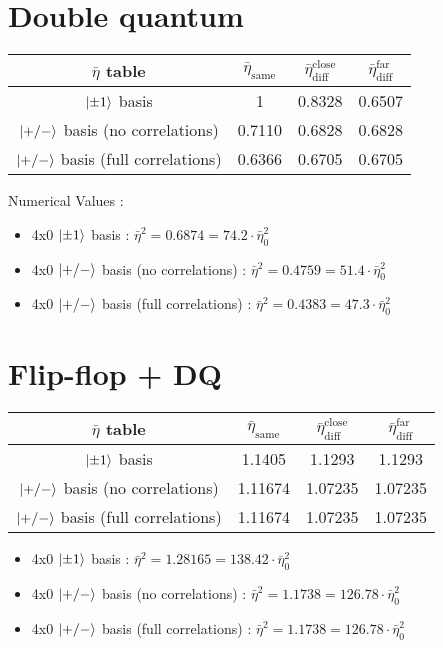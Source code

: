 \documentclass[a4paper]{article}
\begin{document}
\section{Double quantum}
\begin{tabular}{cccc}
\hline
$\bar{\eta}$ table & $\bar{\eta}_\textrm{same}$ & $\bar{\eta}_\textrm{diff}^\textrm{close}$ & $\bar{\eta}_\textrm{diff}^\textrm{far}$ \\
\hline
$\ket{\pm 1}$ basis & 1 & 0.8328 & 0.6507 \\
$\ket{+/-}$ basis (no correlations) & 0.7110  & 0.6828 & 0.6828 \\
$\ket{+/-}$ basis (full correlations) & 0.6366 & 0.6705 & 0.6705  \\
\hline
\end{tabular}

\bigskip
Numerical Values :
\begin{itemize}
\medskip

\item 4x0 $\ket{\pm 1}$ basis : $\bar{\eta}^2 = 0.6874 = 74.2 \cdot \bar{\eta}^2_0$
\item 4x0 $\ket{+/-}$ basis (no correlations) : $\bar{\eta}^2 = 0.4759 = 51.4 \cdot \bar{\eta}^2_0$
\item 4x0 $\ket{+/-}$ basis (full correlations) : $\bar{\eta}^2 = 0.4383 = 47.3 \cdot \bar{\eta}^2_0$

\end{itemize}

\section{Flip-flop + DQ}
\begin{tabular}{cccc}

\hline
$\bar{\eta}$ table & $\bar{\eta}_\textrm{same}$ & $\bar{\eta}_\textrm{diff}^\textrm{close}$ & $\bar{\eta}_\textrm{diff}^\textrm{far}$ \\
\hline
$\ket{\pm 1}$ basis & 1.1405  & 1.1293 & 1.1293 \\
$\ket{+/-}$ basis (no correlations) & 1.11674  & 1.07235 & 1.07235 \\
$\ket{+/-}$ basis (full correlations) & 1.11674  & 1.07235 & 1.07235 \\
\hline
\end{tabular}
\begin{itemize}
\item 4x0 $\ket{\pm 1}$ basis : $\bar{\eta}^2 = 1.28165 = 138.42 \cdot \bar{\eta}^2_0$
\item 4x0 $\ket{+/-}$ basis (no correlations) : $\bar{\eta}^2 = 1.1738 = 126.78 \cdot \bar{\eta}^2_0$
\item 4x0 $\ket{+/-}$ basis (full correlations) : $\bar{\eta}^2 = 1.1738 = 126.78 \cdot \bar{\eta}^2_0$
\end{itemize}
\end{document}

